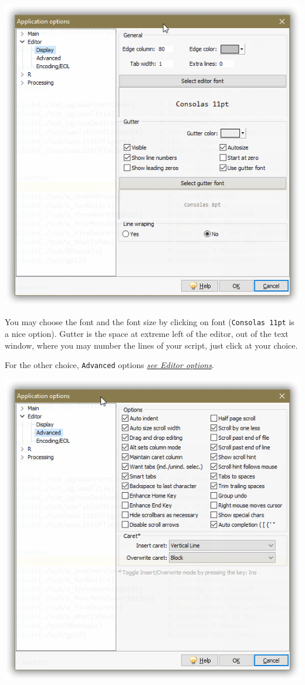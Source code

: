 \includegraphics[scale=0.50]{./res/app_editor_display.png}

You may choose the font and the font size by clicking on font (\texttt{Consolas 11pt} is a nice option).
Gutter is the space at extreme left of the editor, out of the text window,
where you may number the lines of your script, just click at your choice.

For the other choice, \texttt{Advanced} options \textit{\href{\#working\_editor}{see Editor options}}.

\includegraphics[scale=0.40]{./res/app_editor_advanced.png}~~

